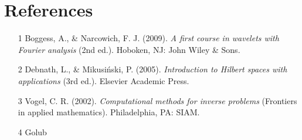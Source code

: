 \documentclass[12pt]{article}
\begin{document}
\section*{References}
\begin{itemize}
	\item[1] Boggess, A., \& Narcowich, F. J. (2009). \textit{A first course in wavelets with Fourier analysis} (2nd ed.). Hoboken, NJ: John Wiley \& Sons.
	\item[2] Debnath, L., \& Mikusi\'{n}ski, P. (2005). \textit{Introduction to Hilbert spaces with applications} (3rd ed.). Elsevier Academic Press.
	\item[3] Vogel, C. R. (2002). \textit{Computational methods for inverse problems} (Frontiers in applied mathematics). Philadelphia, PA: SIAM.
	\item[4] Golub
\end{itemize}
\end{document}
